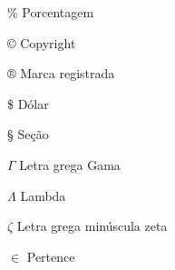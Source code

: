 \begin{simbolos}
  \item [\% ] Porcentagem
  \item [ © ] Copyright
  \item [ ® ] Marca registrada
  \item [ \$ ] Dólar
  \item [ § ] Seção
  \item[$ \Gamma $] Letra grega Gama
  \item[$ \Lambda $] Lambda
  \item[$ \zeta $] Letra grega minúscula zeta
  \item[$ \in $] Pertence
\end{simbolos}